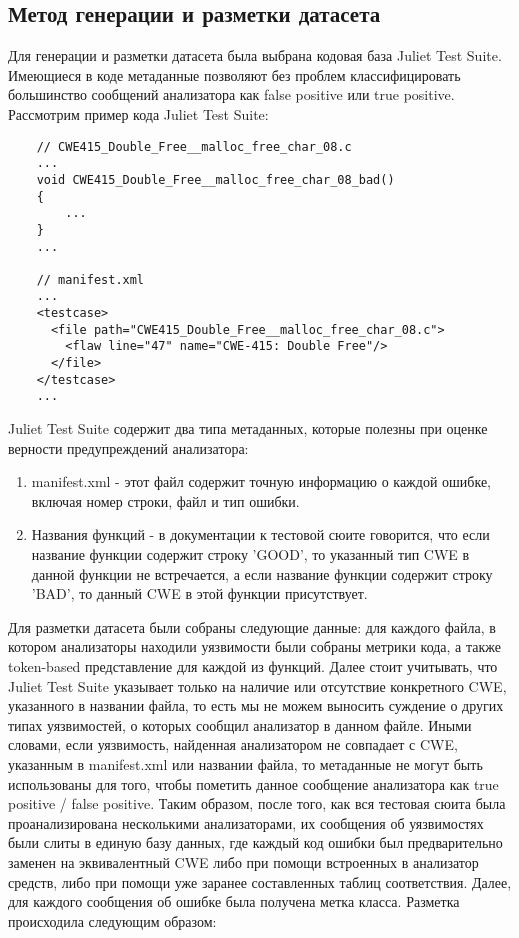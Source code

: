 \subsection{Метод генерации и разметки датасета}
Для генерации и разметки датасета была выбрана кодовая база Juliet Test Suite\cite{Juliet}. Имеющиеся в коде метаданные позволяют без проблем классифицировать большинство сообщений анализатора как false positive или true positive. Рассмотрим пример кода Juliet Test Suite:

\begin{verbatim}
    // CWE415_Double_Free__malloc_free_char_08.c
    ...
    void CWE415_Double_Free__malloc_free_char_08_bad()
    {
        ...
    }
    ...

    // manifest.xml
    ...
    <testcase>
      <file path="CWE415_Double_Free__malloc_free_char_08.c">
        <flaw line="47" name="CWE-415: Double Free"/>
      </file>
    </testcase>
    ...
\end{verbatim}

Juliet Test Suite содержит два типа метаданных, которые полезны при оценке верности предупреждений анализатора:
\begin{enumerate}
    \item manifest.xml - этот файл содержит точную информацию о каждой ошибке, включая номер строки, файл и тип ошибки.
    \item Названия функций - в документации к тестовой сюите говорится, что если название функции содержит строку 'GOOD', то указанный тип CWE в данной функции не встречается, а если название функции содержит строку 'BAD', то данный CWE в этой функции присутствует.
\end{enumerate}

Для разметки датасета были собраны следующие данные: для каждого файла, в котором анализаторы находили уязвимости были собраны метрики кода, а также token-based представление для каждой из функций. Далее стоит учитывать, что Juliet Test Suite указывает только на наличие или отсутствие конкретного CWE, указанного в названии файла, то есть мы не можем выносить суждение о других типах уязвимостей, о которых сообщил анализатор в данном файле. Иными словами, если уязвимость, найденная анализатором не совпадает с CWE, указанным в manifest.xml или названии файла, то метаданные не могут быть использованы для того, чтобы пометить данное сообщение анализатора как true positive / false positive. Таким образом, после того, как вся тестовая сюита была проанализирована несколькими анализаторами, их сообщения об уязвимостях были слиты в единую базу данных, где каждый код ошибки был предварительно заменен на эквивалентный CWE либо при помощи встроенных в анализатор средств, либо при помощи уже заранее составленных таблиц соответствия. Далее, для каждого сообщения об ошибке была получена метка класса. Разметка происходила следующим образом:


